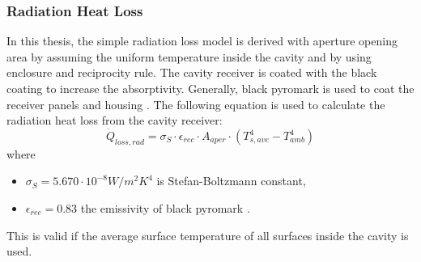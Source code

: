 \subsubsection{Radiation Heat Loss}
In this thesis, the simple radiation loss model is derived with aperture opening area by assuming the uniform temperature inside the cavity and by using enclosure and reciprocity rule. The cavity receiver is coated with the black coating to increase the absorptivity. Generally, black pyromark is used to coat the receiver panels and housing \cite{Zavoico.2001}. The following equation is used to calculate the radiation heat loss from the cavity receiver:
\begin{equation}
\dot Q_{loss,rad}=\sigma_S\cdot \epsilon_{rec}\cdot A_{aper}\cdot (T_{s,ave}^4-T_{amb}^4)
\end{equation}
where 
\begin{itemize}
	\item $\sigma_S = 5.670 \cdot 10^{-8} W / m^2 K^4$ is  Stefan-Boltzmann constant,
	\item $\epsilon_{rec} = 0.83$ the emissivity of black pyromark \cite{Zavoico.2001}.
\end{itemize}
This is valid if the average surface temperature of all surfaces inside the cavity is used.
